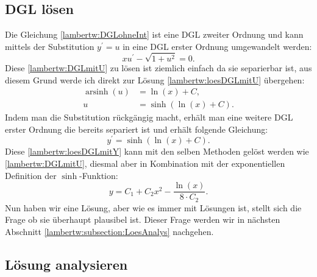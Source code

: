 \subsection{DGL lösen
	\label{lambertw:subsection:DGLloes}}
Die Gleichung \eqref{lambertw:DGLohneInt} ist eine DGL zweiter Ordnung und kann 
mittels der Substitution \(y^{\prime} = u\) in eine DGL erster Ordnung umgewandelt werden:
\begin{equation}
	xu^{\prime} - \sqrt{1+u^2}
	= 0.
	\label{lambertw:DGLmitU}
\end{equation}
Diese \eqref{lambertw:DGLmitU} zu lösen ist ziemlich einfach da sie separierbar ist, aus diesem Grund werde ich direkt zur Lösung \eqref{lambertw:loesDGLmitU} übergehen:
\begin{align}
	\operatorname{arsinh}(u)
	&=
	\operatorname{ln}(x) + C, \\
	u
	&=
	\operatorname{sinh}(\operatorname{ln}(x) + C).
	\label{lambertw:loesDGLmitU}
\end{align}
Indem man die Substitution rückgängig macht, erhält man eine weitere DGL erster Ordnung die bereits separiert ist und erhält folgende Gleichung:
\begin{equation}
	y^{\prime}
	=
	\operatorname{sinh}(\operatorname{ln}(x) + C).
	\label{lambertw:loesDGLmitY}
\end{equation}
Diese \eqref{lambertw:loesDGLmitY} kann mit den selben Methoden gelöst werden wie \eqref{lambertw:DGLmitU}, diesmal aber in Kombination mit der exponentiellen Definition der \(\operatorname{sinh}\)-Funktion:
\begin{equation}
	y
	=
	C_1 + C_2 x^2 - \frac{\operatorname{ln}(x)}{8 \cdot C_2}.
\end{equation}
Nun haben wir eine Lösung, aber wie es immer mit Lösungen ist, stellt sich die Frage ob sie überhaupt plausibel ist. Dieser Frage werden wir in nächsten Abschnitt \ref{lambertw:subsection:LoesAnalys} nachgehen.

\subsection{Lösung analysieren
	\label{lambertw:subsection:LoesAnalys}}

